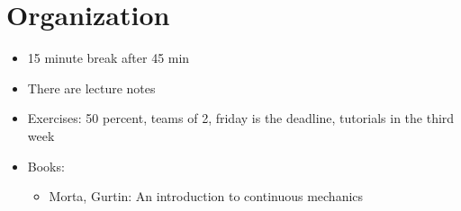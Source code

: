 \section{Organization}

\begin{itemize}
    \item 15 minute break after 45 min
    \item There are lecture notes 
    \item Exercises: 50 percent, teams of 2, friday is the deadline, tutorials in the third week
    \item Books: \begin{itemize}
        \item Morta, Gurtin: An introduction to continuous mechanics
    \end{itemize}
\end{itemize}